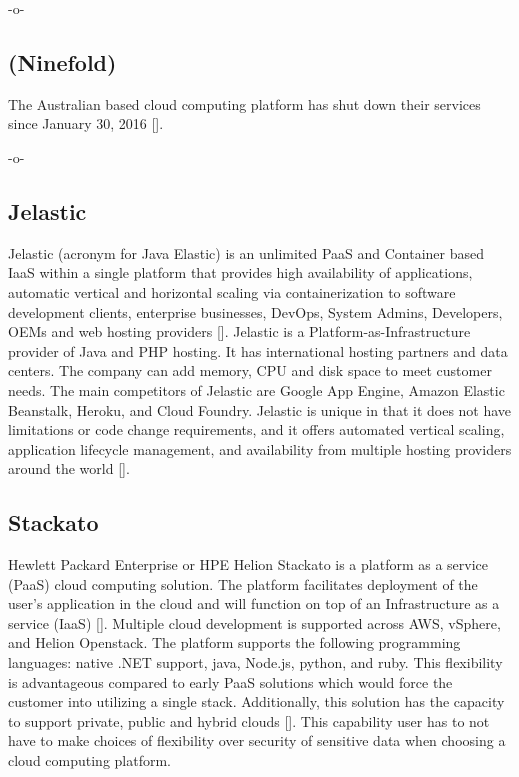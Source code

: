 -o-

\subsection{ (Ninefold)}

The Australian based cloud computing platform has shut down their
services since January 30, 2016 [\cite{www-ninefoldSite}].

    -o-

\subsection{Jelastic}

Jelastic (acronym for Java Elastic) is an unlimited PaaS and Container
based IaaS within a single platform that provides high availability of
applications, automatic vertical and horizontal scaling via
containerization to software development clients, enterprise
businesses, DevOps, System Admins, Developers, OEMs and web hosting
providers [\cite{www-jelastic-2}]. Jelastic is a
Platform-as-Infrastructure provider of Java and PHP hosting.  It has
international hosting partners and data centers. The company can add
memory, CPU and disk space to meet customer needs. The main
competitors of Jelastic are Google App Engine, Amazon Elastic
Beanstalk, Heroku, and Cloud Foundry. Jelastic is unique in that it
does not have limitations or code change requirements, and it offers
automated vertical scaling, application lifecycle management, and
availability from multiple hosting providers around the
world [\cite{www-jelastic-1}].

\subsection{Stackato}
    
Hewlett Packard Enterprise or HPE Helion Stackato is a platform as a
service (PaaS) cloud computing solution.  The platform facilitates
deployment of the user's application in the cloud and will function on
top of an Infrastructure as a service (IaaS) [\cite{www-hpe}]. Multiple
cloud development is supported across AWS, vSphere, and Helion
Openstack.  The platform supports the following programming languages:
native .NET support, java, Node.js, python, and ruby.  This
flexibility is advantageous compared to early PaaS solutions which
would force the customer into utilizing a single stack.  Additionally,
this solution has the capacity to support private, public and hybrid
clouds [\cite{www-virt}]. This capability user has to not have to make
choices of flexibility over security of sensitive data when choosing a
cloud computing platform.

